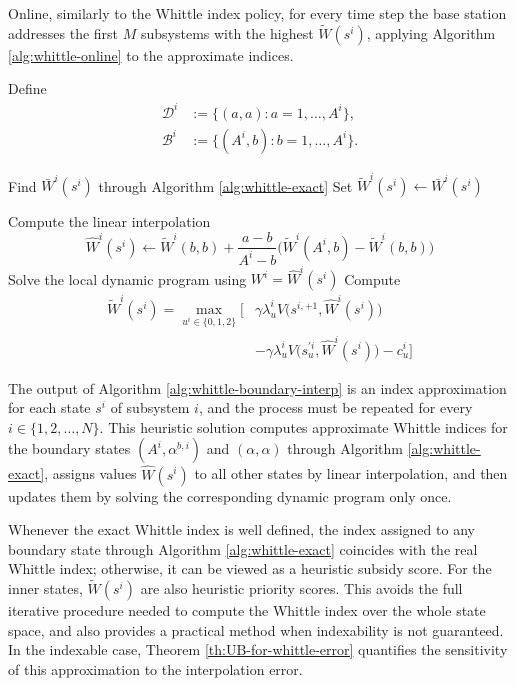 \documentclass[letterpaper,journal]{IEEEtran}
\begin{document}
Online, similarly to the Whittle index policy, for every time step the base station addresses the first $M$ subsystems with the highest $\widetilde{W}(s^i)$, applying Algorithm \ref{alg:whittle-online} to the approximate indices.

\begin{algorithm}[ht]
\caption{Approximate Whittle index computation}
\label{alg:whittle-boundary-interp}
\begin{algorithmic}[1]
	\State Define
		\[
\begin{aligned}
\mathcal D^i&:=\{(a,a): a=1,\dots,A^i\},\\
\mathcal B^i&:=\{(A^i,b): b=1,\dots,A^i\}.
\end{aligned}
\]
			
			\State Find $\bar W^i(s^i)$ through Algorithm \ref{alg:whittle-exact}
			\State Set $\widetilde{W}^i(s^i)\gets \bar W^i(s^i)$
			\EndFor
			
			\State Compute the linear interpolation
			\[
			\widehat{W}^i(s^i)\gets\widetilde{W}^i(b,b)+\frac{a-b}{A^i-b}\Big(
			\widetilde{W}^i(A^i,b)-\widetilde{W}^i(b,b)\Big)
			\]
			\State Solve the local dynamic program using $W^i=\widehat W^i(s^i)$
			\State Compute
			\[
\begin{aligned}
\widetilde{W}^i(s^i)=\max_{u^i \in \{0,1,2\}}\Big[&
\gamma\lambda^i_u V\bigl(s^{i,+1},\widehat{W}^i(s^i)\bigr)\\
&-\gamma\lambda^i_u V\bigl(s^{\prime i}_u, \widehat W^i(s^i)\bigr)-c^i_u\Big]
\end{aligned}
\]
			\EndFor
		\EndFor
\end{algorithmic}
\end{algorithm}

The output of Algorithm \ref{alg:whittle-boundary-interp} is an index approximation for each state $s^i$ of subsystem $i$, and the process must be repeated for every $i\in\{1,2,\dots,N\}$. This heuristic solution computes approximate Whittle indices for the boundary states $(A^i,\alpha^{b,i})$ and $(\alpha,\alpha)$ through Algorithm \ref{alg:whittle-exact}, assigns values $\widehat{W}(s^i)$ to all other states by linear interpolation, and then updates them by solving the corresponding dynamic program only once.

Whenever the exact Whittle index is well defined, the index assigned to any boundary state through Algorithm \ref{alg:whittle-exact} coincides with the real Whittle index; otherwise, it can be viewed as a heuristic subsidy score. For the inner states, $\widetilde{W}(s^i)$ are also heuristic priority scores. This avoids the full iterative procedure needed to compute the Whittle index over the whole state space, and also provides a practical method when indexability is not guaranteed. In the indexable case, Theorem \ref{th:UB-for-whittle-error} quantifies the sensitivity of this approximation to the interpolation error.
\end{document}
